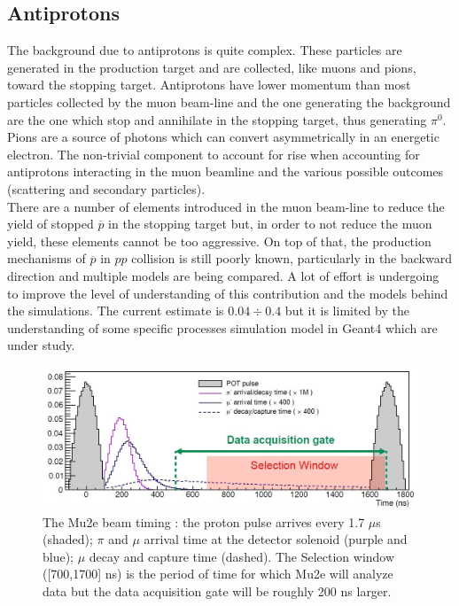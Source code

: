 \documentclass[12pt,a4paper,openright, oneside, titlepage]{book} %
\begin{document}
\subsection{Antiprotons}
\label{sec:antiprotons}
The background due to  antiprotons is quite complex. 
These particles are generated in the production target and are collected, like muons and pions, toward the stopping target. 
Antiprotons have lower momentum than most particles collected by the muon beam-line and the one generating the background are the one which stop and annihilate in the stopping target, thus generating $\pi^0$. 
Pions are a source of photons which can convert asymmetrically in an energetic electron.
The non-trivial component to account for rise when accounting for antiprotons interacting in the muon beamline and the various possible outcomes (scattering and secondary particles).\\
There are a number of elements introduced in the muon beam-line to reduce the yield of stopped $\overline{p}$ in the stopping target but, in order to not reduce the muon yield, these elements cannot be too aggressive. 
On top of that, the production mechanisms of $\overline{p}$ in $pp$ collision is still poorly known, particularly in the backward direction and multiple models are being compared.
A lot of effort is undergoing to improve the level of  understanding of this contribution and the models behind the simulations. 
The current estimate is $0.04 \div 0.4$ \cite{Giovanni:2020} but it is limited by the understanding of some specific processes simulation model in Geant4 which are under study.

\begin{figure}[!htb]
\centering
\includegraphics[scale=0.7]{mu2e_event}
\caption[Mu2e event timing]{The Mu2e beam timing \cite{bob_mu2e}: the proton pulse arrives every 1.7 $\mu$s (shaded); 
$\pi$ and $\mu$ arrival time at the detector solenoid (purple and blue);
$\mu$ decay and capture time (dashed).
The Selection window ([700,1700] ns) is the period of time for which Mu2e will analyze data but the data acquisition gate will be roughly 200 ns larger.}
\label{_mu2e_event}
\end{figure}
\end{document}

